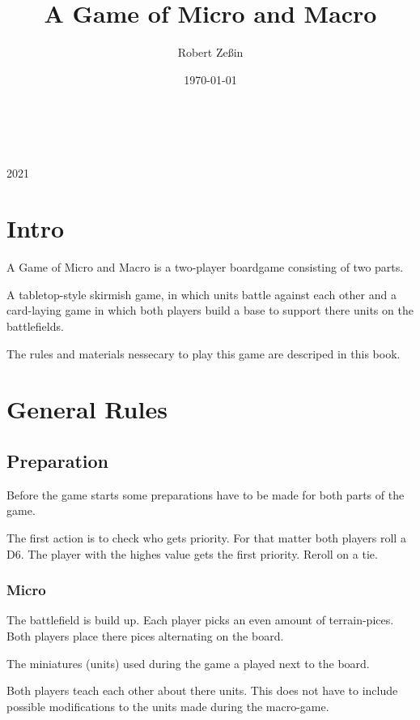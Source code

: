 \documentclass[a5paper,pagesize,10pt,bibtotoc,pointlessnumbers,
normalheadings,DIV=9,twoside=false]{scrbook}
\title{A Game of Micro and Macro}
\author{Robert Zeßin}
\date{\today}
\begin{document}
\begin{titlepage}
		\\
			
		\vspace{10mm}
		\\
		\vspace{\fill}
		\centering \large{2021}
\end{titlepage}

\newpage
\chapter{Intro}

A Game of Micro and Macro is a two-player boardgame consisting of two parts.

A tabletop-style skirmish game, in which units battle against each other and a card-laying game in which both players build a base to support there units on the battlefields.

The rules and materials nessecary to play this game are descriped in this book.

\newpage
\tableofcontents 


\newpage
\chapter{General Rules}

\section{Preparation}
Before the game starts some preparations have to be made for both parts of the game.

The first action is to check who gets priority. For that matter both players roll a D6. The player with the highes value gets the first priority. Reroll on a tie.

\subsection{Micro}
The battlefield is build up. Each player picks an even amount of terrain-pices. Both players place there pices alternating on the board.

The miniatures (units) used during the game a played next to the board.

Both players teach each other about there units. This does not have to include possible modifications to the units made during the macro-game.
\end{document}

